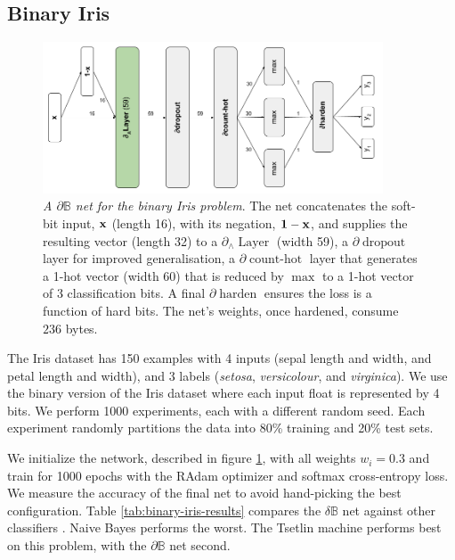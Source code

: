 \documentclass{article} %
\begin{document}
\subsection{Binary Iris}

\begin{figure}[t!]
	\centering
	\includegraphics[width=0.9\textwidth]{binary-iris-architecture.png}
	\caption{{\em A $\partial\mathbb{B}$ net for the binary Iris problem}. The net concatenates the soft-bit input, ${\bf x}$ (length 16), with its negation, ${\bf 1 - x}$, and supplies the resulting vector (length 32) to a $\partial_{\wedge}\!\operatorname{Layer}$ (width 59), a $\partial\!\operatorname{dropout}$ layer for improved generalisation, a $\partial\!\operatorname{count-hot}$ layer that generates a 1-hot vector (width 60) that is reduced by $\operatorname{max}$ to a 1-hot vector of 3 classification bits. A final $\partial\!\operatorname{harden}$ ensures the loss is a function of hard bits. The net's weights, once hardened, consume $236$ bytes.}
	\label{fig:binary-iris-architecture}
\end{figure}

The Iris dataset has 150 examples with 4 inputs (sepal length and width, and petal length and width), and 3 labels ({\em setosa}, {\em versicolour}, and {\em virginica}). We use the binary version of the Iris dataset \citep{binary-iris-dataset} where each input float is represented by 4 bits. We perform 1000 experiments, each with a different random seed. Each experiment randomly partitions the data into 80\% training and 20\% test sets. 

We initialize the network, described in figure \ref{fig:binary-iris-architecture}, with all weights $w_{i} = 0.3$ and train for 1000 epochs with the RAdam optimizer and softmax cross-entropy loss. We measure the accuracy of the final net to avoid hand-picking the best configuration. Table \ref{tab:binary-iris-results} compares the $\delta\mathbb{B}$ net against other classifiers  \citep{granmo18}. Naive Bayes performs the worst. The Tsetlin machine performs best on this problem, with the $\partial\mathbb{B}$ net second.
\end{document}
